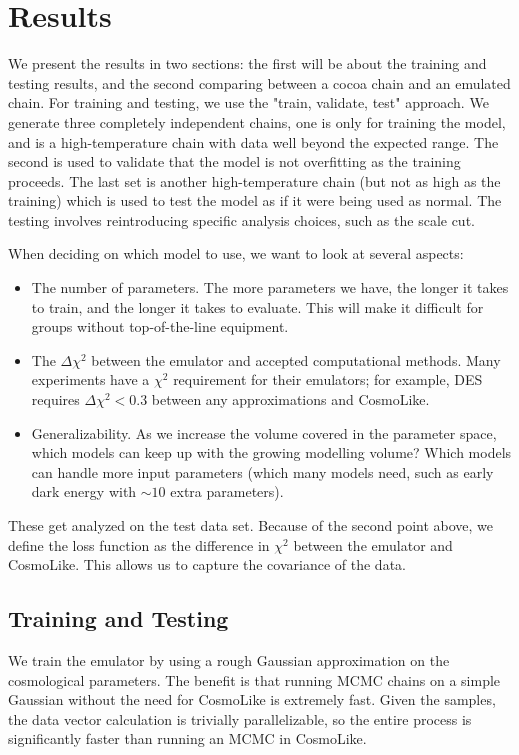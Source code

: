 \section{Results}
We present the results in two sections: the first will be about the training and testing results, and the second comparing between a cocoa chain and an emulated chain. For training and testing, we use the "train, validate, test" approach. We generate three completely independent chains, one is only for training the model, and is a high-temperature chain with data well beyond the expected range. The second is used to validate that the model is not overfitting as the training proceeds. The last set is another high-temperature chain (but not as high as the training) which is used to test the model as if it were being used as normal. The testing involves reintroducing specific analysis choices, such as the scale cut.

When deciding on which model to use, we want to look at several aspects:
\begin{itemize}
	\item The number of parameters. The more parameters we have, the longer it takes to train, and the longer it takes to evaluate. This will make it difficult for groups without top-of-the-line equipment.
	\item The $\Delta\chi^2$ between the emulator and accepted computational methods. Many experiments have a $\chi^2$ requirement for their emulators; for example, DES requires $\Delta\chi^2<0.3$ between any approximations and CosmoLike.
	\item Generalizability. As we increase the volume covered in the parameter space, which models can keep up with the growing modelling volume? Which models can handle more input parameters (which many models need, such as early dark energy with $\sim10$ extra parameters).
\end{itemize}
These get analyzed on the test data set. Because of the second point above, we define the loss function as the difference in $\chi^2$ between the emulator and CosmoLike. This allows us to capture the covariance of the data.
\subsection{Training and Testing}
We train the emulator by using a rough Gaussian approximation on the cosmological parameters. The benefit is that running MCMC chains on a simple Gaussian without the need for CosmoLike is extremely fast. Given the samples, the data vector calculation is trivially parallelizable, so the entire process is significantly faster than running an MCMC in CosmoLike. 

